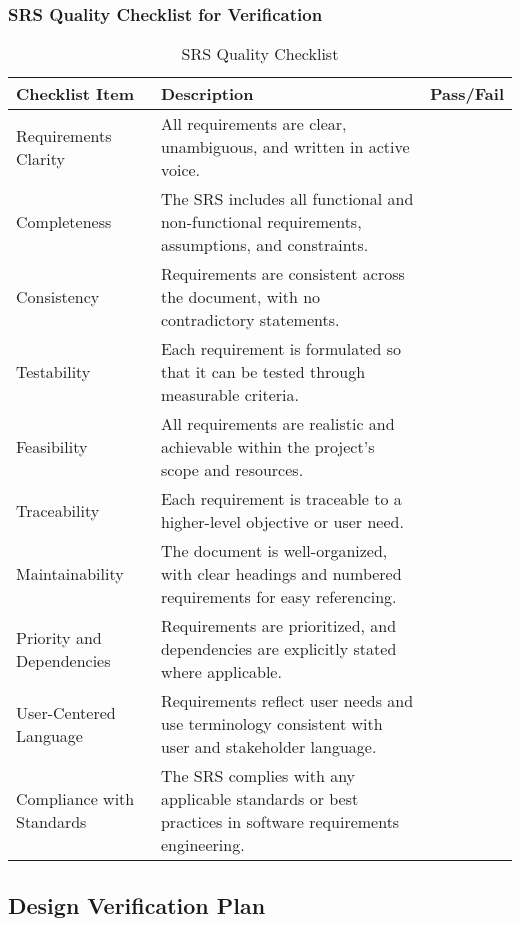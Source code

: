 \documentclass[12pt, titlepage]{article}
\begin{document}
\newpage

\subsubsection{SRS Quality Checklist for Verification}
\begin{table}[h!]
\caption{SRS Quality Checklist}
\begin{tabular}{|>{\raggedright\arraybackslash}p{3cm}|>{\raggedright\arraybackslash}p{9cm}|>{\raggedright\arraybackslash}p{2cm}|}
	\hline
	\textbf{Checklist Item} & \textbf{Description} & \textbf{Pass/Fail} \\
	\hline
	Requirements Clarity & All requirements are clear, unambiguous, and written in active voice. & \\
	\hline
	Completeness & The SRS includes all functional and non-functional requirements, assumptions, and constraints. & \\
	\hline
	Consistency & Requirements are consistent across the document, with no contradictory statements. & \\
	\hline
	Testability & Each requirement is formulated so that it can be tested through measurable criteria. & \\
	\hline
	Feasibility & All requirements are realistic and achievable within the project's scope and resources. & \\
	\hline
	Traceability & Each requirement is traceable to a higher-level objective or user need. & \\
	\hline
	Maintainability	& The document is well-organized, with clear headings and numbered requirements for easy referencing. & \\
	\hline
	Priority and Dependencies & Requirements are prioritized, and dependencies are explicitly stated where applicable. & \\
	\hline
	User-Centered Language & Requirements reflect user needs and use terminology consistent with user and stakeholder language. & \\
	\hline
	Compliance with Standards & The SRS complies with any applicable standards or best practices in software requirements engineering. & \\
	\hline

\end{tabular}
\end{table}

\newpage

\subsection{Design Verification Plan}
\end{document}
